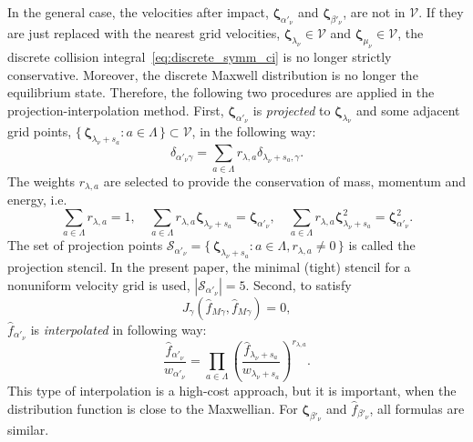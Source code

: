 \documentclass[]{jfm}
\newcommand{\bzeta}{\boldsymbol{\zeta}}
\newcommand{\Set}[2]{\{\,{#1}:{#2}\,\}}
\begin{document}
In the general case, the velocities after impact,
\(\bzeta_{\alpha'_\nu}\) and \(\bzeta_{\beta'_\nu}\), are not in \(\mathcal{V}\).
If they are just replaced with the nearest grid velocities,
\(\bzeta_{\lambda_\nu}\in\mathcal{V}\) and \(\bzeta_{\mu_\nu}\in\mathcal{V}\),
the discrete collision integral~\eqref{eq:discrete_symm_ci} is no longer strictly conservative.
Moreover, the discrete Maxwell distribution is no longer the equilibrium state.
Therefore, the following two procedures are applied in the projection-interpolation method.
First, \(\bzeta_{\alpha'_\nu}\) is \emph{projected} to \(\bzeta_{\lambda_\nu}\) and
some adjacent grid points, \(\Set{\bzeta_{\lambda_\nu+s_a}}{a\in\Lambda}\subset\mathcal{V}\),
in the following way:
\begin{equation}\label{eq:ci_projection}
    \delta_{\alpha'_\nu\gamma} = \sum_{a\in\Lambda} r_{\lambda,a}\delta_{\lambda_\nu+s_a,\gamma}.
\end{equation}
The weights \(r_{\lambda,a}\) are selected to provide the conservation of mass, momentum and energy, i.e.
\begin{equation}\label{eq:impact_conservation}
    \sum_{a\in\Lambda} r_{\lambda,a} = 1, \quad
    \sum_{a\in\Lambda} r_{\lambda,a} \bzeta_{\lambda_\nu+s_a} = \bzeta_{\alpha'_\nu}, \quad
    \sum_{a\in\Lambda} r_{\lambda,a} \bzeta_{\lambda_\nu+s_a}^2 = \bzeta_{\alpha'_\nu}^2.
\end{equation}
The set of projection points \(\mathcal{S}_{\alpha'_\nu} = \Set{\bzeta_{\lambda_\nu+s_a}}{a\in\Lambda, r_{\lambda,a}\neq0}\)
is called the projection stencil.
In the present paper, the minimal (tight) stencil for a nonuniform velocity grid is used, \(|\mathcal{S}_{\alpha'_\nu}|=5\).
Second, to satisfy
\begin{equation}\label{eq:strict_interpolation}
    J_\gamma(\hat{f}_{M\gamma}, \hat{f}_{M\gamma}) = 0,
\end{equation}
\(\hat{f}_{\alpha'_\nu}\) is \emph{interpolated} in following way:
\begin{equation}\label{eq:ci_interpolation}
    \frac{\hat{f}_{\alpha'_\nu}}{w_{\alpha'_\nu}} = \prod_{a\in\Lambda}
        \left(\frac{\hat{f}_{\lambda_\nu+s_a}}{w_{\lambda_\nu+s_a}} \right)^{r_{\lambda,a}}.
\end{equation}
This type of interpolation is a high-cost approach, but it is important,
when the distribution function is close to the Maxwellian.
For \(\bzeta_{\beta'_\nu}\) and \(\hat{f}_{\beta'_\nu}\), all formulas are similar.
\end{document}
